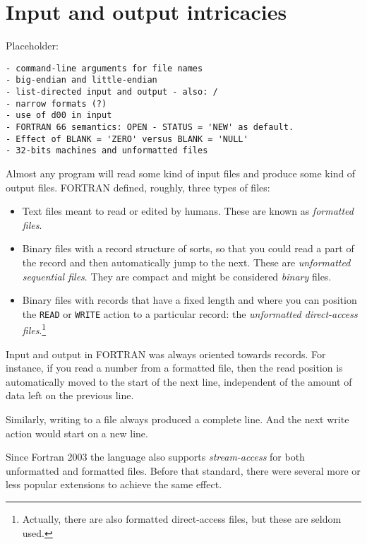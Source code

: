 \section{Input and output intricacies}
Placeholder:
\begin{verbatim}
- command-line arguments for file names
- big-endian and little-endian
- list-directed input and output - also: /
- narrow formats (?)
- use of d00 in input
- FORTRAN 66 semantics: OPEN - STATUS = 'NEW' as default.
- Effect of BLANK = 'ZERO' versus BLANK = 'NULL'
- 32-bits machines and unformatted files
\end{verbatim}

Almost any program will read some kind of input files and produce some kind of
output files. FORTRAN defined, roughly, three types of files:
\begin{itemize}
\item
Text files meant to read or edited by humans. These are known as \emph{formatted files}.
\item
Binary files with a record structure of sorts, so that you could read a part of the
record and then automatically jump to the next. These are \emph{unformatted sequential files}.
They are compact and might be considered \emph{binary} files.
\item
Binary files with records that have a fixed length and where you can position the \verb+READ+
or \verb+WRITE+ action to a particular record: the \emph{unformatted direct-access files}.\footnote{
Actually, there are also formatted direct-access files, but these are seldom used.}
\end{itemize}

Input and output in FORTRAN was always oriented towards records. For instance, if you read a number
from a formatted file, then the read position is automatically moved to the start of the next line,
independent of the amount of data left on the previous line.

Similarly, writing to a file always produced a complete line. And the next write action would start
on a new line.

Since Fortran 2003 the language also supports \emph{stream-access} for both unformatted and formatted
files. Before that standard, there were several more or less popular extensions to achieve the same
effect.


